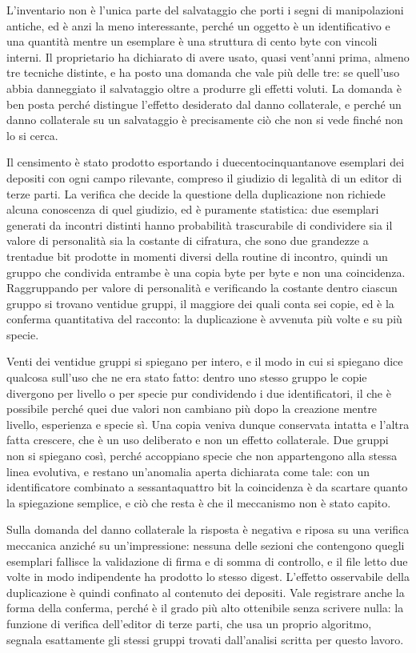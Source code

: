 L'inventario non è l'unica parte del salvataggio che porti i segni di manipolazioni antiche, ed è anzi la meno interessante, perché un oggetto è un identificativo e una quantità mentre un esemplare è una struttura di cento byte con vincoli interni. Il proprietario ha dichiarato di avere usato, quasi vent'anni prima, almeno tre tecniche distinte, e ha posto una domanda che vale più delle tre: se quell'uso abbia danneggiato il salvataggio oltre a produrre gli effetti voluti. La domanda è ben posta perché distingue l'effetto desiderato dal danno collaterale, e perché un danno collaterale su un salvataggio è precisamente ciò che non si vede finché non lo si cerca.

Il censimento è stato prodotto esportando i duecentocinquantanove esemplari dei depositi con ogni campo rilevante, compreso il giudizio di legalità di un editor di terze parti. La verifica che decide la questione della duplicazione non richiede alcuna conoscenza di quel giudizio, ed è puramente statistica: due esemplari generati da incontri distinti hanno probabilità trascurabile di condividere sia il valore di personalità sia la costante di cifratura, che sono due grandezze a trentadue bit prodotte in momenti diversi della routine di incontro, quindi un gruppo che condivida entrambe è una copia byte per byte e non una coincidenza. Raggruppando per valore di personalità e verificando la costante dentro ciascun gruppo si trovano ventidue gruppi, il maggiore dei quali conta sei copie, ed è la conferma quantitativa del racconto: la duplicazione è avvenuta più volte e su più specie.

Venti dei ventidue gruppi si spiegano per intero, e il modo in cui si spiegano dice qualcosa sull'uso che ne era stato fatto: dentro uno stesso gruppo le copie divergono per livello o per specie pur condividendo i due identificatori, il che è possibile perché quei due valori non cambiano più dopo la creazione mentre livello, esperienza e specie sì. Una copia veniva dunque conservata intatta e l'altra fatta crescere, che è un uso deliberato e non un effetto collaterale. Due gruppi non si spiegano così, perché accoppiano specie che non appartengono alla stessa linea evolutiva, e restano un'anomalia aperta dichiarata come tale: con un identificatore combinato a sessantaquattro bit la coincidenza è da scartare quanto la spiegazione semplice, e ciò che resta è che il meccanismo non è stato capito.

Sulla domanda del danno collaterale la risposta è negativa e riposa su una verifica meccanica anziché su un'impressione: nessuna delle sezioni che contengono quegli esemplari fallisce la validazione di firma e di somma di controllo, e il file letto due volte in modo indipendente ha prodotto lo stesso digest. L'effetto osservabile della duplicazione è quindi confinato al contenuto dei depositi. Vale registrare anche la forma della conferma, perché è il grado più alto ottenibile senza scrivere nulla: la funzione di verifica dell'editor di terze parti, che usa un proprio algoritmo, segnala esattamente gli stessi gruppi trovati dall'analisi scritta per questo lavoro.

